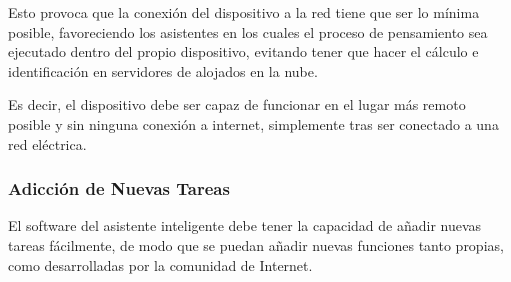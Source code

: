 Esto provoca que la conexión del dispositivo a la red tiene que ser lo mínima posible, favoreciendo los asistentes en los cuales el proceso de pensamiento sea ejecutado dentro del propio dispositivo, evitando tener que hacer el cálculo e identificación en servidores de alojados en la nube.

Es decir, el dispositivo debe ser capaz de funcionar en el lugar más remoto posible y sin ninguna conexión a internet, simplemente tras ser conectado a una red eléctrica.

\subsubsection{Adicción de Nuevas Tareas}

El software del asistente inteligente debe tener la capacidad de añadir nuevas tareas fácilmente, de modo que se puedan añadir nuevas funciones tanto propias, como desarrolladas por la comunidad de Internet.